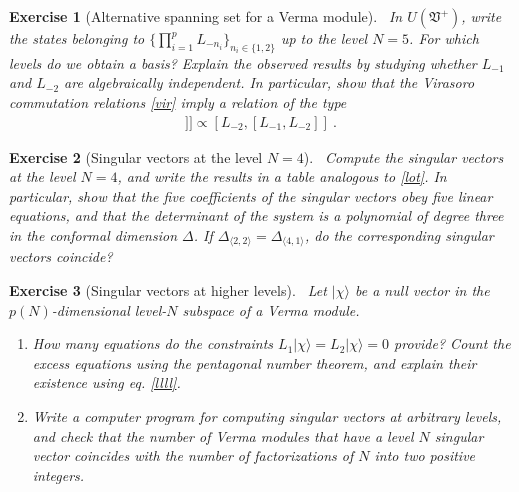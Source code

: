 \documentclass[12pt, a4paper, notitlepage, twoside]{report}
\numberwithin{equation}{section}
\theoremstyle{break}
\newtheorem{exo}{Exercise}[chapter]
\begin{document}
\begin{exo}[Alternative spanning set for a Verma module]
 ~\label{exoot}
In $U(\mathfrak{V}^+)$, write the states belonging to  $\{\prod_{i=1}^p L_{-n_i}\}_{n_i\in\{1,2\}}$ up to the level $N=5$.
For which levels do we obtain a basis? Explain the observed results by studying whether $L_{-1}$ and $L_{-2}$ are algebraically independent.
In particular, show that the Virasoro commutation relations \eqref{vir} imply a relation of the type
\begin{align}
 [L_{-1},[L_{-1},[L_{-1},L_{-2}]]] \propto [L_{-2},[L_{-1},L_{-2}]]\ .
 \label{llll}
\end{align}
\end{exo}

\begin{exo}[Singular vectors at the level $N=4$]
~\label{exolf}
 Compute the singular vectors at the level $N=4$, and write the results in a table analogous to \eqref{lot}.
In particular, show that the five coefficients of the singular vectors obey five linear equations, and that the determinant of the system is a polynomial of degree three in the conformal dimension $\Delta$. 
If $\Delta_{\langle 2,2 \rangle} = \Delta_{\langle 4, 1\rangle}$, do the corresponding singular vectors coincide?
\end{exo}

\begin{exo}[Singular vectors at higher levels]
~\label{exohl}
Let $|\chi\rangle$ be
a null vector in the $p(N)$-dimensional level-$N$ subspace of a Verma module.
\begin{enumerate}
 \item How many equations do the constraints $L_1|\chi\rangle = L_2|\chi\rangle = 0$ provide? Count the excess equations using the pentagonal number theorem, and explain their existence using eq. \eqref{llll}.
 \item
 Write a computer program for computing singular vectors at arbitrary levels, and check that the number of Verma modules that have a level $N$ singular vector coincides with the number of factorizations of $N$ into two positive integers.
\end{enumerate}
\end{exo}
\end{document}
